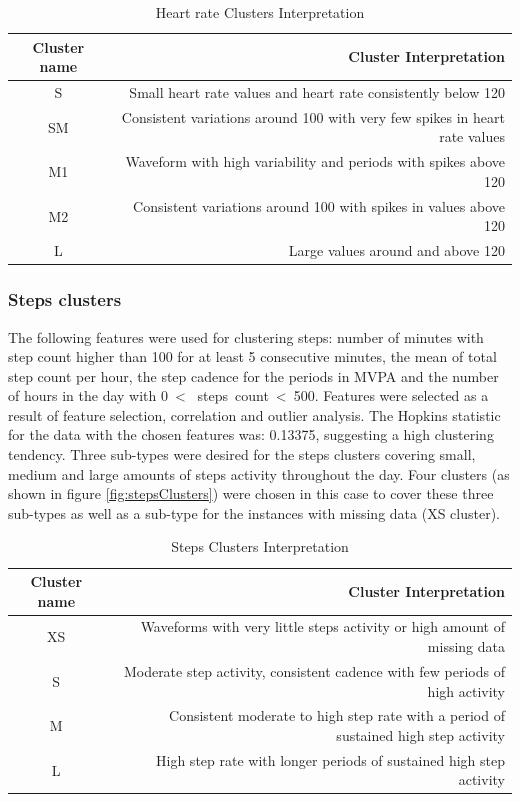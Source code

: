 \documentclass{article}
\begin{document}
\begin{table}[H]
  \caption{Heart rate Clusters Interpretation}
  \label{hr_inter}
  \centering
  \begin{tabular}{ c|d }
    \toprule
    \cmidrule(r){1-2}
    Cluster name & Cluster Interpretation \\
    \midrule
    S & Small heart rate values and heart rate consistently below 120 \\
    \midrule
    SM & Consistent variations around 100 with very few spikes in heart rate values \\
    \midrule
    M1 &  Waveform with high variability and periods with spikes above 120 \\
    \midrule
    M2 & Consistent variations around 100 with spikes in values above 120 \\
    \midrule
    L &  Large values around and above 120 \\
    \bottomrule
    \end{tabular}
\end{table}

\subsubsection{Steps clusters}

The following features were used for clustering steps: number of minutes with step count higher than 100 for at least 5 consecutive minutes, the mean of total step count per hour, the step cadence for the periods in MVPA and the number of hours in the day with 0~< ~steps~count~<~500. Features were selected as a result of feature selection, correlation and outlier analysis. The Hopkins statistic for the data with the chosen features was: 0.13375, suggesting a high clustering tendency. Three sub-types were desired for the steps clusters covering small, medium and large amounts of steps activity throughout the day. Four clusters (as shown in figure \ref{fig:stepsClusters}) were chosen in this case to cover these three sub-types as well as a sub-type for the instances with missing data (XS cluster). 


\begin{table}[H]
  \caption{Steps Clusters Interpretation}
  \label{steps_inter}
  \centering
  \begin{tabular}{ c|d }
    \toprule
    \cmidrule(r){1-2}
    Cluster name & Cluster Interpretation \\
    \midrule
    XS & Waveforms with very little steps activity or high amount of missing data \\
    \midrule
    S & Moderate step activity, consistent cadence with few periods of high activity\\
    \midrule
    M & Consistent moderate to high step rate with a period of sustained high step activity \\
    \midrule
    L & High step rate with longer periods of sustained high step activity \\
    \bottomrule
    \end{tabular}
\end{table}
\end{document}
